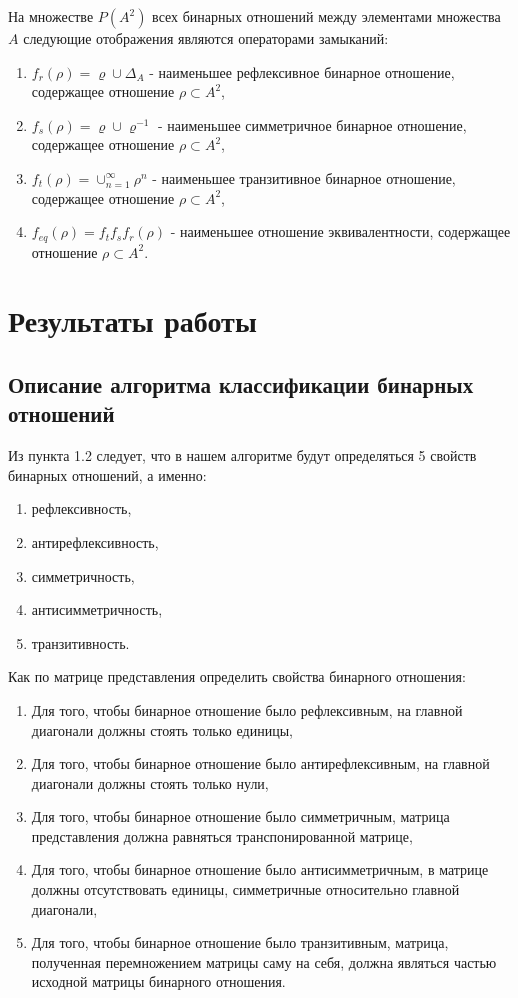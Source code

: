 \documentclass[bachelor, och, labwork]{shiza}
\begin{document}
	На множестве $P(A^2)$ всех бинарных отношений между элементами множества $A$ следующие отображения являются операторами замыканий:

	\begin{enumerate}
		\item $f_r(\rho) = \varrho \cup \Delta_A$ - наименьшее рефлексивное бинарное отношение, содержащее отношение $\rho \subset A^2$,
		\item $f_s(\rho) = \varrho \cup \varrho^{-1}$ - наименьшее симметричное бинарное отношение, содержащее отношение $\rho \subset A^2$,
		\item $f_t(\rho) = \cup_{n=1}^{\infty}\rho^n $ - наименьшее транзитивное бинарное отношение, содержащее отношение $\rho \subset A^2$,
		\item $f_{eq}(\rho) = f_{t}f_{s} f_{r}(\rho)$ - наименьшее отношение эквивалентности, содержащее отношение $\rho \subset A^2$.
	\end{enumerate}
	
	
	\section{Результаты работы}
	\subsection{Описание алгоритма классификации бинарных отношений}
	
	Из пункта 1.2 следует, что в нашем алгоритме будут определяться 5 свойств бинарных отношений, а именно:
	
	\begin{enumerate}
		\item рефлексивность,
		\item антирефлексивность,
		\item симметричность,
		\item антисимметричность,
		\item транзитивность.
	\end{enumerate}
	
		Как по матрице представления определить свойства бинарного отношения:
	\begin{enumerate}
		\item Для того, чтобы бинарное отношение было $\textit{рефлексивным}$, на главной  диагонали должны стоять только единицы,
		\item Для того, чтобы бинарное отношение было $\textit{антирефлексивным}$, на главной  диагонали должны стоять только нули,
		\item Для того, чтобы бинарное отношение было $\textit{симметричным}$, матрица представления должна равняться транспонированной матрице,
		\item Для того, чтобы бинарное отношение было $\textit{антисимметричным}$, в матрице должны отсутствовать единицы, симметричные относительно главной диагонали,
		\item Для того, чтобы бинарное отношение было $\textit{транзитивным}$, матрица, полученная перемножением матрицы саму на себя, должна являться частью исходной матрицы бинарного отношения.

	\end{enumerate}
				
\end{document}
